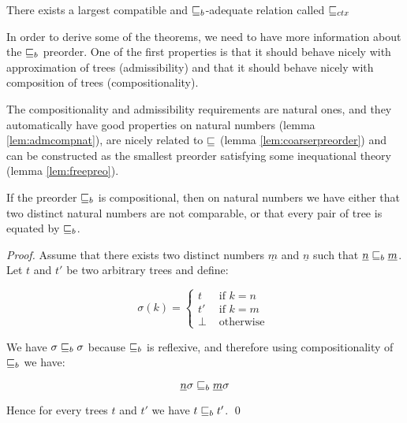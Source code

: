 \begin{definition}
    There exists a largest compatible and $\sqsubseteq_b$-adequate 
    relation called $\sqsubseteq_{ctx}$
\end{definition}

In order to derive some of the theorems, we need to have more information 
about the $\sqsubseteq_b$ preorder. One of the first properties is that 
it should behave nicely with approximation of trees (admissibility) and 
that it should behave nicely with composition of trees (compositionality).

\vspace{1em}

The compositionality and admissibility requirements are 
natural ones, and they automatically have good properties 
on natural numbers (lemma \ref{lem:admcompnat}),
are nicely related to $\sqsubseteq$ (lemma \ref{lem:coarserpreorder})
and can be constructed as the smallest preorder 
satisfying some inequational theory (lemma \ref{lem:freepreo}).

\begin{lemma}
    \label{lem:admcompnat}
    If the preorder $\sqsubseteq_b$ is  
    compositional, then on natural 
    numbers we have either that two distinct 
    natural numbers are not comparable, 
    or that every pair of tree is equated  
    by $\sqsubseteq_b$.
\end{lemma}



\begin{proof}
    Assume that there exists two distinct numbers $\underline{m}$
    and $\underline{n}$ such that $\underline{n} \sqsubseteq_b \underline{m}$.
    Let $t$ and $t'$ be 
    two arbitrary trees and define:

    \begin{equation*}
        \sigma(k) = \begin{cases}
            t  & \text{ if } k = n \\
            t' & \text{ if } k = m \\
            \bot  & \text{ otherwise } 
        \end{cases}
    \end{equation*}

    We have $\sigma \sqsubseteq_b \sigma$ because $\sqsubseteq_b$
    is reflexive, and therefore using compositionality 
    of $\sqsubseteq_b$ we have:

    \begin{equation*}
        \underline{n}\sigma \sqsubseteq_b \underline{m}\sigma
    \end{equation*}

    Hence for every trees $t$ and $t'$ we have 
    $t \sqsubseteq_b t'$.
\qed\end{proof}

